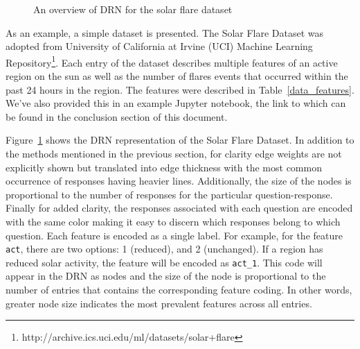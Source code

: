\begin{figure}[]
    \noindent
    \caption{An overview of DRN for the solar flare dataset \label{solar}}
\end{figure}

As an example, a simple dataset is presented. The Solar Flare Dataset was adopted from University of California at Irvine (UCI) Machine Learning Repository\footnote{http://archive.ics.uci.edu/ml/datasets/solar+flare}. Each entry of the dataset describes multiple features of an active region on the sun as well as the number of flares events that occurred within the past 24 hours in the region. The features were described in Table~\ref{data_features}.  We've also provided this in an example Jupyter notebook, the link to which can be found in the conclusion section of this document.

Figure~\ref{solar} shows the DRN representation of the Solar Flare Dataset. In addition to the methods mentioned in the previous section, for clarity edge weights are not explicitly shown but translated into edge thickness with the most common occurrence of responses having heavier lines. Additionally, the size of the nodes is proportional to the number of responses for the particular question-response. Finally for added clarity, the responses associated with each question are encoded with the same color making it easy to discern which responses belong to which question. Each feature is encoded as a single label. For example, for the feature \texttt{act}, there are two options: 1 (reduced), and 2 (unchanged). If a region has reduced solar activity, the feature will be encoded as \texttt{act\_1}. This code will appear in the DRN as nodes and the size of the node is proportional to the number of entries that contains the corresponding feature coding. In other words, greater node size indicates the most prevalent features across all entries. 

